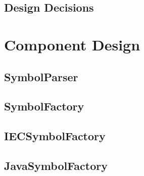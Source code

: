\subsection{Design Decisions}
\subsubsection{}
	
\section{Component Design}
\subsection{SymbolParser}


\subsection{SymbolFactory}

\subsection{IECSymbolFactory}

\subsection{JavaSymbolFactory}





